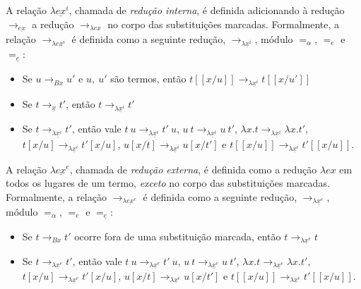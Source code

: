 A relação $\lambda \underline{ex}^i$, chamada de \emph{redução interna}, é
definida adicionando à redução $\rightarrow_{\underline{ex}}$ a redução
$\rightarrow_{\lambda ex}$ no corpo das substituições marcadas.
Formalmente, a relação $\rightarrow_{\lambda \underline{ex}^i}$ é definida como a
seguinte redução, $\rightarrow_{\lambda \underline{x}^i}$, módulo $=_{\alpha}$,
$=_e$ e $=_{\underline{e}}$:

\begin{itemize}
    \item Se $u \rightarrow_{Bx} u'$ e $u,\ u'$ são termos, então $t[\![x/u]\!]
        \rightarrow_{\lambda \underline{x}^i} t[\![x/u']\!]$ 
    \item Se $t
        \rightarrow_{\underline{x}} t'$, então $t \rightarrow_{\lambda
            \underline{x}^i} t'$
    \item Se $t \rightarrow_{\lambda \underline{x}^i} t'$, então vale 
        $t\ u \rightarrow_{\lambda \underline{x}^i} t'\ u$,  
        $u\ t \rightarrow_{\lambda \underline{x}^i} u\ t'$, 
        $\lambda x. t \rightarrow_{\lambda \underline{x}^i} \lambda x. t'$, 
        $t[x/u] \rightarrow_{\lambda \underline{x}^i} t'[x/u]$, 
        $u[x/t] \rightarrow_{\lambda \underline{x}^i} u[x/t']$ e 
        $t[\![x/u]\!] \rightarrow_{\lambda \underline{x}^i} t'[\![x/u]\!]$.
\end{itemize}


A relação $\lambda \underline{ex}^e$, chamada de \emph{redução externa}, é
definida como a redução $\lambda ex$ em todos os lugares de um
termo, \emph{exceto} no corpo das substituições marcadas.
Formalmente, a relação $\rightarrow_{\lambda \underline{ex}^e}$ é definida como a
seguinte redução, $\rightarrow_{\lambda \underline{x}^e}$, módulo $=_{\alpha}$,
$=_e$ e $=_{\underline{e}}$:

\begin{itemize}
    \item Se $t \rightarrow_{Bx} t'$ ocorre fora de uma substituição marcada, então 
        $t \rightarrow_{\lambda \underline{x}^e} t$ 
    \item Se $t \rightarrow_{\lambda \underline{x}^e} t'$, então vale 
        $t\ u \rightarrow_{\lambda \underline{x}^e} t'\ u$,  
        $u\ t \rightarrow_{\lambda \underline{x}^e} u\ t'$, 
        $\lambda x. t \rightarrow_{\lambda \underline{x}^e} \lambda x. t'$, 
        $t[x/u] \rightarrow_{\lambda \underline{x}^e} t'[x/u]$, 
        $u[x/t] \rightarrow_{\lambda \underline{x}^e} u[x/t']$ e 
        $t[\![x/u]\!] \rightarrow_{\lambda \underline{x}^e} t'[\![x/u]\!]$.
\end{itemize}

